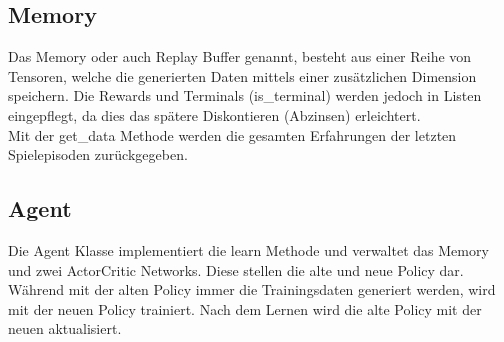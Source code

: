 \subsection{Memory} \label{subsec:Implementierung_Memory_PPO}
Das Memory oder auch Replay Buffer genannt, besteht aus einer Reihe von Tensoren, welche die generierten Daten mittels einer zusätzlichen Dimension speichern. Die Rewards und Terminals (is\_terminal) werden jedoch in Listen eingepflegt, da dies das spätere Diskontieren (Abzinsen) erleichtert.\\
Mit der get\_data Methode werden die gesamten Erfahrungen der letzten Spielepisoden zurückgegeben. 

\subsection{Agent} \label{subsec:Implementierung_PPO_Agent}
Die Agent Klasse implementiert die learn Methode und verwaltet das Memory und zwei ActorCritic Networks. Diese stellen die alte und neue Policy dar. Während mit der alten Policy immer die Trainingsdaten generiert werden, wird mit der neuen Policy trainiert. Nach dem Lernen wird die alte Policy mit der neuen aktualisiert.

